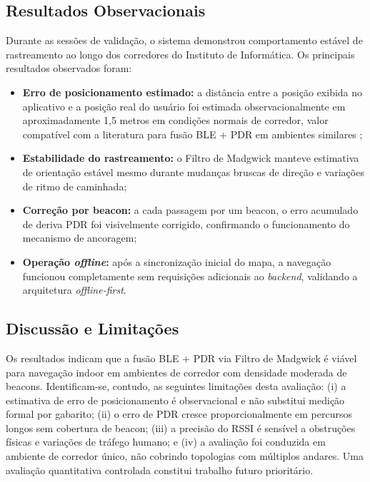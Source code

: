 \documentclass[12pt]{article}
\begin{document}
\subsection{Resultados Observacionais}

Durante as sessões de validação, o sistema demonstrou comportamento estável de
rastreamento ao longo dos corredores do Instituto de Informática. Os principais
resultados observados foram:

\begin{itemize}
  \item \textbf{Erro de posicionamento estimado:} a distância entre a posição
        exibida no aplicativo e a posição real do usuário foi estimada
        observacionalmente em aproximadamente 1,5 metros em condições normais
        de corredor, valor compatível com a literatura para fusão BLE + PDR
        em ambientes similares \cite{Faragher2015};
  \item \textbf{Estabilidade do rastreamento:} o Filtro de Madgwick manteve
        estimativa de orientação estável mesmo durante mudanças bruscas de
        direção e variações de ritmo de caminhada;
  \item \textbf{Correção por beacon:} a cada passagem por um beacon, o erro
        acumulado de deriva PDR foi visivelmente corrigido, confirmando o
        funcionamento do mecanismo de ancoragem;
  \item \textbf{Operação \textit{offline}:} após a sincronização inicial do
        mapa, a navegação funcionou completamente sem requisições adicionais
        ao \textit{backend}, validando a arquitetura \textit{offline-first}.
\end{itemize}

\subsection{Discussão e Limitações}

Os resultados indicam que a fusão BLE + PDR via Filtro de Madgwick é viável para
navegação indoor em ambientes de corredor com densidade moderada de beacons.
Identificam-se, contudo, as seguintes limitações desta avaliação: (i) a estimativa
de erro de posicionamento é observacional e não substitui medição formal por gabarito;
(ii) o erro de PDR cresce proporcionalmente em percursos longos sem cobertura de
beacon; (iii) a precisão do RSSI é sensível a obstruções físicas e variações de
tráfego humano; e (iv) a avaliação foi conduzida em ambiente de corredor único,
não cobrindo topologias com múltiplos andares. Uma avaliação quantitativa
controlada constitui trabalho futuro prioritário.
\end{document}
